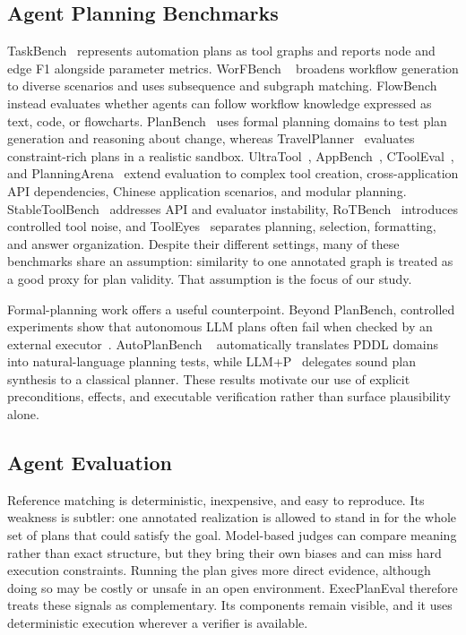 \documentclass[10pt]{article}
\begin{document}
\subsection{Agent Planning Benchmarks}
TaskBench~\cite{shen2024taskbench} represents automation plans as tool graphs
and reports node and edge F1 alongside parameter metrics. WorFBench
~\cite{qiao2025worfbench} broadens workflow generation to diverse scenarios and
uses subsequence and subgraph matching. FlowBench~\cite{xiao2024flowbench}
instead evaluates whether agents can follow workflow knowledge expressed as
text, code, or flowcharts. PlanBench~\cite{valmeekam2024planbench} uses formal
planning domains to test plan generation and reasoning about change, whereas
TravelPlanner~\cite{xie2024travelplanner} evaluates constraint-rich plans in a
realistic sandbox. UltraTool~\cite{huang2024ultratool},
AppBench~\cite{wang2024appbench}, CToolEval~\cite{guo2024ctooleval}, and
PlanningArena~\cite{zheng2025planningarena} extend evaluation to complex tool
creation, cross-application API dependencies, Chinese application scenarios,
and modular planning. StableToolBench~\cite{guo2024stabletoolbench} addresses
API and evaluator instability, RoTBench~\cite{ye2024rotbench} introduces
controlled tool noise, and ToolEyes~\cite{ye2025tooleyes} separates planning,
selection, formatting, and answer organization. Despite their different
settings, many of these benchmarks share an assumption: similarity to one
annotated graph is treated as a good proxy for plan validity. That assumption
is the focus of our study.

Formal-planning work offers a useful counterpoint. Beyond PlanBench, controlled
experiments show that autonomous LLM plans often fail when checked by an
external executor~\cite{valmeekam2023critical}. AutoPlanBench
~\cite{stein2023autoplanbench} automatically translates PDDL domains into
natural-language planning tests, while LLM+P~\cite{liu2023llmp} delegates
sound plan synthesis to a classical planner. These results motivate our use of
explicit preconditions, effects, and executable verification rather than
surface plausibility alone.

\subsection{Agent Evaluation}
Reference matching is deterministic, inexpensive, and easy to reproduce. Its
weakness is subtler: one annotated realization is allowed to stand in for the
whole set of plans that could satisfy the goal. Model-based judges can compare
meaning rather than exact structure, but they bring their own biases and can
miss hard execution constraints. Running the plan gives more direct evidence,
although doing so may be costly or unsafe in an open environment. ExecPlanEval
therefore treats these signals as complementary. Its components remain
visible, and it uses deterministic execution wherever a verifier is available.
\end{document}
